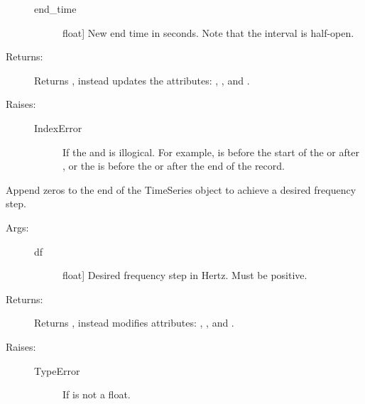 \documentclass[letterpaper,10pt,english]{sphinxmanual}
\begin{document}
\begin{fulllineitems}
\begin{fulllineitems}
\begin{description}
\begin{description}
\item[{end\_time}] \leavevmode{[}float{]}
New end time in seconds. Note that the interval is
half-open.

\end{description}

\item[{Returns:}] \leavevmode
Returns , instead updates the attributes: , 
, and .

\item[{Raises:}] \leavevmode\begin{description}
\item[{IndexError }] \leavevmode
If the  and  is illogical.
For example,  is before the start of the
 or after , or the  is
before the  or after the end of the record.

\end{description}

\end{description}

\end{fulllineitems}


\begin{fulllineitems}
\label{\detokenize{index:sigpropy.TimeSeries.zero_pad}}
Append zeros to the end of the TimeSeries object to achieve a
desired frequency step.
\begin{description}
\item[{Args:}] \leavevmode\begin{description}
\item[{df}] \leavevmode{[}float{]}
Desired frequency step in Hertz. Must be positive.

\end{description}

\item[{Returns:}] \leavevmode
Returns , instead modifies attributes: ,
, and .

\item[{Raises:}] \leavevmode\begin{description}
\item[{TypeError}] \leavevmode
If  is not a float.


\end{description}
\end{description}
\end{fulllineitems}
\end{fulllineitems}
\end{document}
